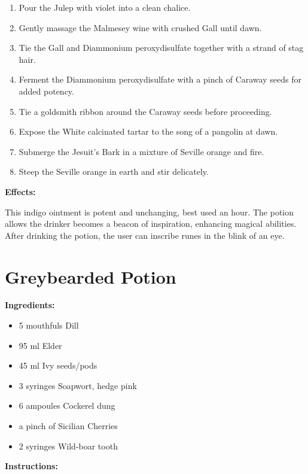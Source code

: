 \documentclass{article}
\begin{document}
\begin{enumerate}
  \item Pour the Julep with violet into a clean chalice.
  \item Gently massage the Malmesey  wine with crushed Gall until dawn.
  \item Tie the Gall and Diammonium peroxydisulfate together with a strand of stag hair.
  \item Ferment the Diammonium peroxydisulfate with a pinch of Caraway seeds for added potency.
  \item Tie a goldsmith ribbon around the Caraway seeds before proceeding.
  \item Expose the White calcinated tartar to the song of a pangolin at dawn.
  \item Submerge the Jesuit's Bark in a mixture of Seville orange and fire.
  \item Steep the Seville orange in earth and stir delicately.
\end{enumerate}

\textbf{Effects:}

This indigo ointment is potent and unchanging, best used an hour. The potion allows the drinker becomes a beacon of inspiration, enhancing magical abilities. After drinking the potion, the user can inscribe runes in the blink of an eye.

\newpage
\section*{Greybearded Potion}

\textbf{Ingredients:}

\begin{itemize}
  \item 5 mouthfuls Dill
  \item 95 ml Elder
  \item 45 ml Ivy seeds/pods
  \item 3 syringes Soapwort, hedge pink
  \item 6 ampoules Cockerel dung
  \item a pinch of Sicilian Cherries
  \item 2 syringes Wild-boar tooth
\end{itemize}

\textbf{Instructions:}
\end{document}
